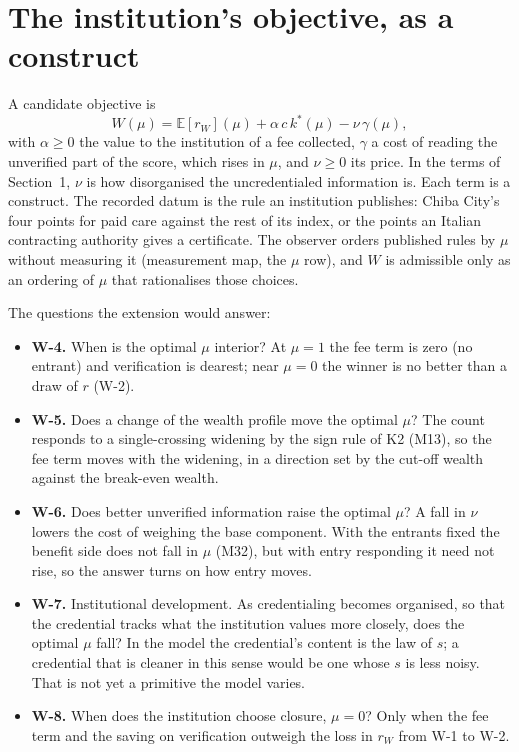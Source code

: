 \documentclass[11pt]{article}
\begin{document}
\section{The institution's objective, as a construct}

A candidate objective is
\[
  W(\mu)=\mathbb E[r_W](\mu)+\alpha\,c\,k^*(\mu)-\nu\,\gamma(\mu),
\]
with $\alpha\ge0$ the value to the institution of a fee collected, $\gamma$ a
cost of reading the unverified part of the score, which rises in $\mu$, and
$\nu\ge0$ its price. In the terms of Section~1, $\nu$ is how disorganised the
uncredentialed information is. Each term is a construct. The recorded datum is the rule an institution
publishes: Chiba City's four points for paid care against the rest of its
index, or the points an Italian contracting authority gives a certificate. The
observer orders published rules by $\mu$ without measuring it (measurement map,
the $\mu$ row), and $W$ is admissible only as an ordering of $\mu$ that
rationalises those choices.

The questions the extension would answer:
\begin{itemize}
\item \textbf{W-4.} When is the optimal $\mu$ interior? At $\mu=1$ the fee term
  is zero (no entrant) and verification is dearest; near $\mu=0$ the winner is
  no better than a draw of $r$ (W-2).
\item \textbf{W-5.} Does a change of the wealth profile move the optimal $\mu$?
  The count responds to a single-crossing widening by the sign rule of K2 (M13),
  so the fee term moves with the widening, in a direction set by the cut-off
  wealth against the break-even wealth.
\item \textbf{W-6.} Does better unverified information raise the optimal $\mu$?
  A fall in $\nu$ lowers the cost of weighing the base component. With the
  entrants fixed the benefit side does not fall in $\mu$ (M32), but with entry
  responding it need not rise, so the answer turns on how entry moves.
\item \textbf{W-7.} Institutional development. As credentialing becomes
  organised, so that the credential tracks what the institution values more
  closely, does the optimal $\mu$ fall? In the model the credential's content
  is the law of $s$; a credential that is cleaner in this sense would be one
  whose $s$ is less noisy. That is not yet a primitive the model varies.
\item \textbf{W-8.} When does the institution choose closure, $\mu=0$? Only
  when the fee term and the saving on verification outweigh the loss in $r_W$
  from W-1 to W-2.
\end{itemize}
\end{document}
